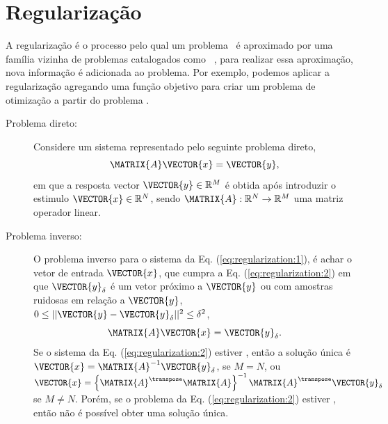 

\section{Regularização}



A regularização é o processo pelo qual um problema \illposed~é 
aproximado por uma família vizinha de problemas catalogados como \wellposed~\cite[pp. 49]{engl2000regularization},
para realizar essa aproximação, nova informação  é adicionada ao problema.
Por exemplo, podemos aplicar a regularização agregando uma função objetivo para criar um problema de otimização
a partir do problema \illposed.

\begin{description}
\item[Problema direto:] Considere um sistema representado pelo seguinte problema direto,
\begin{equation}\label{eq:regularization:1}
\MATRIX{A}\VECTOR{x}=\VECTOR{y},
\end{equation}
em que a resposta vector $\VECTOR{y}\in \mathbb{R}^M$ é obtida
 após introduzir o estimulo $\VECTOR{x}\in \mathbb{R}^N$,
sendo $\MATRIX{A}:\mathbb{R}^N \rightarrow \mathbb{R}^M$ uma matriz operador linear.

\item[Problema inverso:] O problema inverso para o sistema da Eq. (\ref{eq:regularization:1}), é
achar o vetor de entrada $\VECTOR{x}$, que cumpra  a Eq. (\ref{eq:regularization:2})
em que $\VECTOR{y}_{\delta}$ é um vetor próximo a $\VECTOR{y}$ ou com amostras ruidosas em relação a $\VECTOR{y}$,
 $0\leq||\VECTOR{y}-\VECTOR{y}_{\delta}||^2\leq \delta^2$,
\begin{equation}\label{eq:regularization:2}
\MATRIX{A}\VECTOR{x}=\VECTOR{y}_{\delta}.
\end{equation}
Se o sistema da Eq. (\ref{eq:regularization:2}) estiver \wellposed,
então a solução única é $\VECTOR{x}=\MATRIX{A}^{-1}\VECTOR{y}_{\delta}$, se $M=N$,
ou $\VECTOR{x}=\left\{\MATRIX{A}^{\transpose}\MATRIX{A}\right\}^{-1}\MATRIX{A}^{\transpose}\VECTOR{y}_{\delta}$ se $M\neq N$.
Porém, se o problema da Eq. (\ref{eq:regularization:2}) estiver \illposed,
então não é possível obter uma solução única.\\
\end{description}


